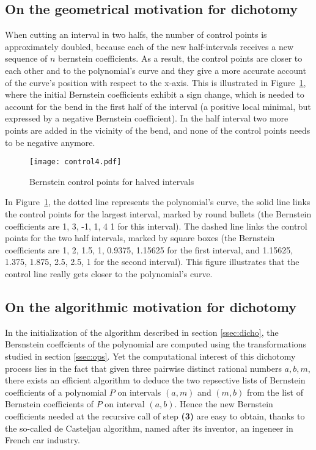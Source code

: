 \documentclass{mscs}
\begin{document}
\subsection{On the geometrical motivation for dichotomy}\label{ssec:dichogeom}
When cutting an interval in two halfs, the number of control points is
approximately doubled, because each of the new half-intervals receives a
new sequence of \(n\) bernstein coefficients.  As a result, the control points
are closer to each other and to the polynomial's curve and they give a more
accurate account of the curve's position with respect to the x-axis.  This is
illustrated in Figure~\ref{dichotomy-curve}, where the initial Bernstein
coefficients exhibit a sign change, which is needed to account for the bend
in the first half of the interval (a positive local minimal, but expressed
by a negative Bernstein coefficient).  In the half interval two more points
are added in the vicinity of the bend, and none of the control points needs
to be negative anymore.
\begin{figure}
\texttt{[image: control4.pdf]}
\caption{\label{dichotomy-curve}Bernstein control points for halved intervals}
\end{figure}

In Figure~\ref{dichotomy-curve}, the dotted line represents
the polynomial's curve, the solid line links the control points for
the largest interval, marked by round bullets (the Bernstein coefficients are
1, 3, -1, 1, 4 1 for this interval).  The dashed line links the control points
for the two half intervals, marked by square boxes
(the Bernstein coefficients are 1, 2, 1.5, 1,
0.9375, 1.15625 for the first interval, and 1.15625, 1.375, 1.875, 2.5, 2.5,
1 for the second interval).  This figure illustrates that the control line
really gets closer to the polynomial's curve.

\subsection{On the algorithmic motivation for dichotomy}

In the initialization of the algorithm described in section
\ref{ssec:dicho}, the Bersnstein coeffcients of the polynomial are
computed using the transformations studied in section \ref{ssec:ops}.
Yet the computational interest of this dichotomy process lies in the
fact that given three pairwise distinct rational numbers $a, b, m$,
there exists an efficient algorithm to deduce the two repsective lists
of Bernstein coefficients of a polynomial $P$ on intervals $(a, m)$
and $(m, b)$ from the list of Bernstein coefficients of $P$ on
interval $(a, b)$. Hence the new Bernstein coefficients needed at the
recursive call of step {\bf (3)} are easy to obtain, thanks to the
so-called de Casteljau algorithm, named after its inventor, an
ingeneer in French car industry.
\end{document}
